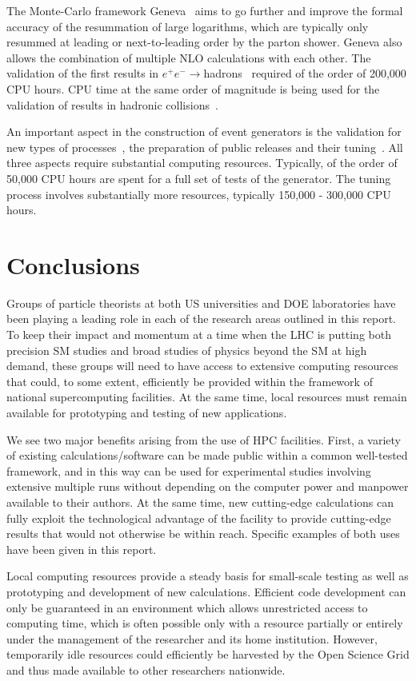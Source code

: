 The Monte-Carlo framework Geneva~\cite{Alioli:2012fc} aims to go further 
and improve the formal accuracy of the resummation of large logarithms, 
which are typically only resummed at leading or next-to-leading order 
by the parton shower. Geneva also allows the combination of multiple 
NLO calculations with each other. The validation of the first results in 
$e^+ e^-\to$hadrons~\cite{Alioli:2012fc} required of the order of 200,000 
CPU hours. CPU time at the same order of magnitude is being used for the
validation of results in hadronic collisions~\cite{Alioli:2013vza}.

An important aspect in the construction of event generators is the validation
for new types of processes~\cite{Buckley:2010ar}, the preparation of 
public releases and their tuning~\cite{Buckley:2009bj}. 
All three aspects require substantial computing resources. Typically,
of the order of 50,000 CPU hours are spent for a full set of tests of the 
generator. The tuning process involves substantially more resources, typically
150,000 - 300,000 CPU hours.


\section{Conclusions}
\label{sec:summary}

Groups of particle theorists at both US universities and DOE
laboratories have been playing a leading role in each of the research
areas outlined in this report. To keep their impact and momentum at a time 
when the LHC is putting both precision SM studies and broad studies
of physics beyond the SM at high demand, these groups will need to have
access to extensive computing resources that could, to some extent, efficiently 
be provided within the framework of national supercomputing facilities.
At the same time, local resources must remain available for prototyping 
and testing of new applications.

We see two major benefits arising from the use of HPC facilities.  
First, a variety of existing
calculations/software can be made public within a common well-tested
framework, and in this way can be used for experimental studies
involving extensive multiple runs without depending on the computer
power and manpower available to their authors.  At the same time, new
cutting-edge calculations can fully exploit the technological advantage
of the facility to provide cutting-edge results that would not otherwise 
be within reach. Specific examples of both uses have been given in this report.

Local computing resources provide a steady basis for small-scale
testing as well as prototyping and development of new calculations.
Efficient code development can only be guaranteed in an environment 
which allows unrestricted access to computing time, which is often
possible only with a resource partially or entirely under the management
of the researcher and its home institution. However, temporarily idle 
resources could efficiently be harvested by the Open Science Grid 
and thus made available to other researchers nationwide.

\clearpage

  



